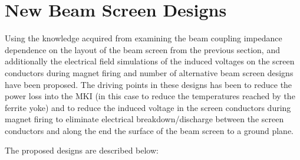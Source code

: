 \section{New Beam Screen Designs}

Using the knowledge acquired from examining the beam coupling impedance dependence on the layout of the beam screen from the previous section, and additionally the electrical field simulations of the induced voltages on the screen conductors during magnet firing and number of alternative beam screen designs have been proposed. The driving points in these designs has been to reduce the power loss into the MKI (in this case to reduce the temperatures reached by the ferrite yoke) and to reduce the induced voltage in the screen conductors during magnet firing to eliminate electrical breakdown/discharge between the screen conductors and along the end the surface of the beam screen to a ground plane.

The proposed designs are described below:

